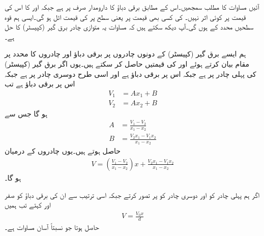 آئیں مساوات  کا مطلب سمجھیں۔اس کے مطابق برقی دباؤ کا دارومدار صرف  پر ہے  جبکہ  اور  کا اس کی قیمت پر کوئی اثر نہیں۔ کی کسی بھی قیمت پر یعنی  سطح پر  کی قیمت اٹل ہو گی۔ایسی ہم قوہ سطحیں  محدد کے   ہوں گی۔آپ دیکھ سکتے ہیں کہ مساوات  یہ متوازی چادر برق گیر (کپیسٹر)  کا حل ہے۔

ہم ایسے برق گیر (کپیسٹر)  کے دونوں چادروں پر برقی دباؤ اور چادروں کا  محدد پر مقام بیان کرتے ہوئے   اور  کی قیمتیں حاصل کر سکتے ہیں۔یوں اگر برق گیر (کپیسٹر)  کی پہلی  چادر   پر ہے جبکہ اس پر برقی دباؤ  ہے اور اسی طرح دوسری چادر  پر ہے جبکہ اس پر برقی دباؤ  ہے تب
\begin{align*}
V_1&=A x_1+B\\
V_2&=Ax_2+B
\end{align*}
ہو گا جس سے
\begin{align*}
A&=\frac{V_1-V_2}{x_1-x_2}\\
B&=\frac{V_2 x_1-V_1x_2}{x_1-x_2}
\end{align*}
حاصل ہوتے ہیں۔یوں چادروں کے درمیان
\begin{align}
V=\left(\frac{V_1-V_2}{x_1-x_2}\right)x+\frac{V_2 x_1-V_1x_2}{x_1-x_2}
\end{align}
ہو گا۔

اگر ہم پہلی  چادر کو  اور دوسری چادر کو  پر تصور کرتے جبکہ اسی ترتیب سے ان کی برقی دباؤ کو صفر اور  کہتے تب ہمیں
\begin{align}\label{مساوات_لاپلاس_کارتیسی_برقی_دباو}
V=\frac{V_0 x}{d}
\end{align}
حاصل ہوتا جو نسبتاً آسان مساوات ہے۔

